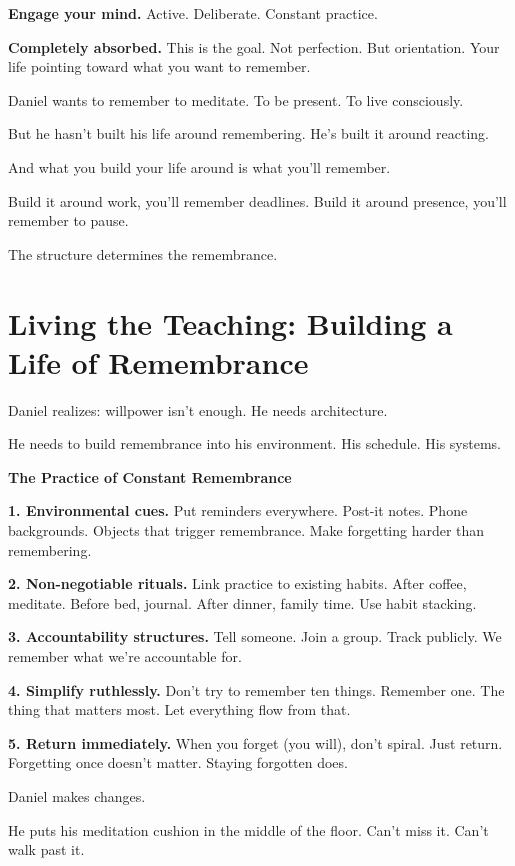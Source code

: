 \documentclass[11pt,twoside]{book}
\begin{document}
\textbf{\textbf{Engage your mind.}} Active. Deliberate. Constant practice.

\textbf{\textbf{Completely absorbed.}} This is the goal. Not perfection. But orientation. Your life pointing toward what you want to remember.

Daniel wants to remember to meditate. To be present. To live consciously.

But he hasn't built his life around remembering. He's built it around reacting.

And what you build your life around is what you'll remember.

Build it around work, you'll remember deadlines. Build it around presence, you'll remember to pause.

The structure determines the remembrance.

\section*{Living the Teaching: Building a Life of Remembrance}

Daniel realizes: willpower isn't enough. He needs architecture.

He needs to build remembrance into his environment. His schedule. His systems.

\begin{practicebox}
\textbf{The Practice of Constant Remembrance}

\textbf{1. Environmental cues.} Put reminders everywhere. Post-it notes. Phone backgrounds. Objects that trigger remembrance. Make forgetting harder than remembering.

\textbf{2. Non-negotiable rituals.} Link practice to existing habits. After coffee, meditate. Before bed, journal. After dinner, family time. Use habit stacking.

\textbf{3. Accountability structures.} Tell someone. Join a group. Track publicly. We remember what we're accountable for.

\textbf{4. Simplify ruthlessly.} Don't try to remember ten things. Remember one. The thing that matters most. Let everything flow from that.

\textbf{5. Return immediately.} When you forget (you will), don't spiral. Just return. Forgetting once doesn't matter. Staying forgotten does.
\end{practicebox}

Daniel makes changes.

He puts his meditation cushion in the middle of the floor. Can't miss it. Can't walk past it.
\end{document}
